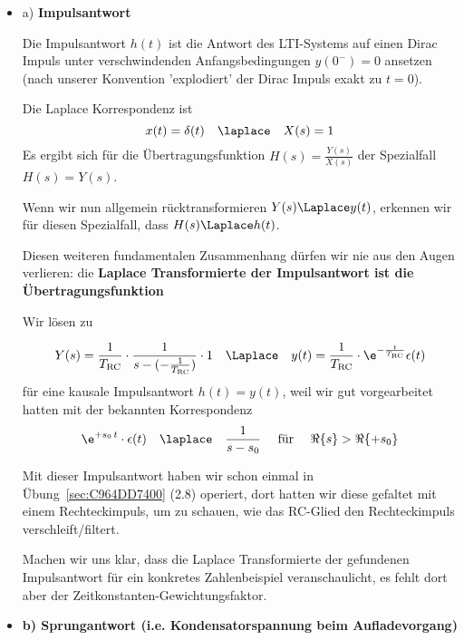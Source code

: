 \begin{Loesung}


\begin{itemize}
  \item a) \textbf{Impulsantwort}

  Die Impulsantwort $h(t)$ ist die Antwort des LTI-Systems auf einen Dirac Impuls unter
  verschwindenden Anfangsbedingungen $y(0^-)=0$ ansetzen (nach
  unserer Konvention 'explodiert' der Dirac Impuls exakt zu $t=0$).

  Die Laplace Korrespondenz ist
  \begin{equation}
  x(t)=\delta(t) \quad\laplace\quad X(s) = 1
  \end{equation}
  Es ergibt sich für die Übertragungsfunktion $H(s)=\frac{Y(s)}{X(s)}$
  der Spezialfall $H(s)=Y(s)$.

  Wenn wir nun allgemein rücktransformieren $Y(s) \Laplace y(t)$, erkennen wir
  für diesen Spezialfall, dass $H(s) \Laplace h(t)$.

  Diesen weiteren fundamentalen Zusammenhang dürfen wir nie aus den Augen verlieren:
  die \textbf{Laplace Transformierte der Impulsantwort ist die Übertragungsfunktion}

  Wir lösen zu

  \begin{align}
  Y(s) = \frac{1}{T_\mathrm{RC}}\cdot\frac{1}{s - (-\frac{1}{T_\mathrm{RC}})} \cdot 1
  \quad\Laplace\quad
  y(t) = \frac{1}{T_\mathrm{RC}} \cdot \e^{-\frac{t}{T_\mathrm{RC}}} \epsilon(t)
  \end{align}
  für eine kausale Impulsantwort $h(t)=y(t)$, weil wir gut vorgearbeitet hatten
  mit der bekannten Korrespondenz
  \begin{align}
  \e^{+s_0 \, t} \cdot \epsilon(t) \quad \laplace \quad \frac{1}{s-s_0} \quad\text{ für } \quad\Re\{s\} > \Re\{+s_0\}
  \end{align}

  Mit dieser Impulsantwort haben wir schon einmal in Übung~\ref{sec:C964DD7400} (2.8) operiert, dort
  hatten wir diese gefaltet mit einem Rechteckimpuls, um zu schauen, wie das RC-Glied
  den Rechteckimpuls verschleift/filtert.

  Machen wir uns klar, dass 
  die Laplace Transformierte der gefundenen Impulsantwort für ein konkretes
  Zahlenbeispiel veranschaulicht, es fehlt dort aber der Zeitkonstanten-Gewichtungsfaktor.

  \item \textbf{b) Sprungantwort (i.e. Kondensatorspannung beim Aufladevorgang)}


\end{itemize}
\end{Loesung}
